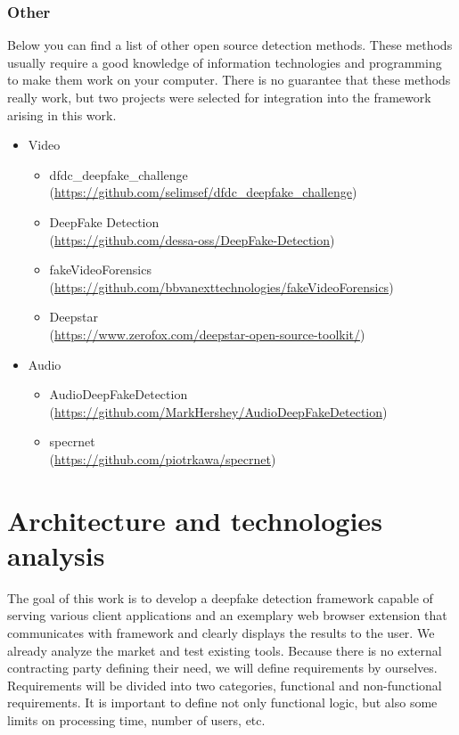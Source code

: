 \subsection{Other}

Below you can find a list of other open source detection methods. These methods usually require a good knowledge of information technologies and programming to make them work on your computer. There is no guarantee that these methods really work, but two projects were selected for integration into the framework arising in this work.

\begin{itemize}
    \item Video
    \begin{itemize}
        \item dfdc\_deepfake\_challenge \\ (\url{https://github.com/selimsef/dfdc_deepfake_challenge})
        \item DeepFake Detection \\ (\url{https://github.com/dessa-oss/DeepFake-Detection})
        \item fakeVideoForensics \\ (\url{https://github.com/bbvanexttechnologies/fakeVideoForensics})
        \item Deepstar \\ (\url{https://www.zerofox.com/deepstar-open-source-toolkit/})
    \end{itemize}
\newpage
    \item Audio
    \begin{itemize}
        \item AudioDeepFakeDetection \\ (\url{https://github.com/MarkHershey/AudioDeepFakeDetection})
        \item specrnet \\ (\url{https://github.com/piotrkawa/specrnet})
    \end{itemize}
\end{itemize}

\chapter{Architecture and technologies analysis}

The goal of this work is to develop a deepfake detection framework capable of serving various client applications and an exemplary web browser extension that communicates with framework and clearly displays the results to the user. We already analyze the market and test existing tools. Because there is no external contracting party defining their need, we will define requirements by ourselves. Requirements will be divided into two categories, functional and non-functional requirements. It is important to define not only functional logic, but also some limits on processing time, number of users, etc.

